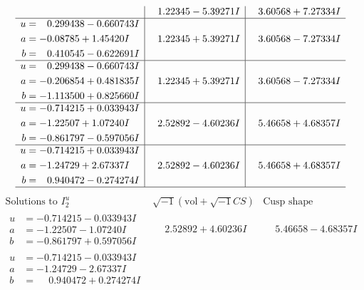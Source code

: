 \documentclass[1p]{elsarticle_modified}
\theoremstyle{definition}
\newcommand{\I}{\sqrt{-1}}
\begin{document}
$$\begin{array}{c|c|c}
 & \phantom{-}1.22345 - 5.39271 I & \phantom{-}3.60568 + 7.27334 I \\ \hline\begin{aligned}
u &= \phantom{-}0.299438 - 0.660743 I \\
a &= -0.08785 + 1.45420 I \\
b &= \phantom{-}0.410545 - 0.622691 I\end{aligned}
 & \phantom{-}1.22345 + 5.39271 I & \phantom{-}3.60568 - 7.27334 I \\ \hline\begin{aligned}
u &= \phantom{-}0.299438 - 0.660743 I \\
a &= -0.206854 + 0.481835 I \\
b &= -1.113500 + 0.825660 I\end{aligned}
 & \phantom{-}1.22345 + 5.39271 I & \phantom{-}3.60568 - 7.27334 I \\ \hline\begin{aligned}
u &= -0.714215 + 0.033943 I \\
a &= -1.22507 + 1.07240 I \\
b &= -0.861797 - 0.597056 I\end{aligned}
 & \phantom{-}2.52892 - 4.60236 I & \phantom{-}5.46658 + 4.68357 I \\ \hline\begin{aligned}
u &= -0.714215 + 0.033943 I \\
a &= -1.24729 + 2.67337 I \\
b &= \phantom{-}0.940472 - 0.274274 I\end{aligned}
 & \phantom{-}2.52892 - 4.60236 I & \phantom{-}5.46658 + 4.68357 I\\
 \hline 
 \end{array}$$\newpage$$\begin{array}{c|c|c}  
\text{Solutions to }I^u_{2}& \I (\text{vol} + \sqrt{-1}CS) & \text{Cusp shape}\\
 \hline 
\begin{aligned}
u &= -0.714215 - 0.033943 I \\
a &= -1.22507 - 1.07240 I \\
b &= -0.861797 + 0.597056 I\end{aligned}
 & \phantom{-}2.52892 + 4.60236 I & \phantom{-}5.46658 - 4.68357 I \\ \hline\begin{aligned}
u &= -0.714215 - 0.033943 I \\
a &= -1.24729 - 2.67337 I \\
b &= \phantom{-}0.940472 + 0.274274 I\end{aligned}

\end{array}$$
\end{document}
